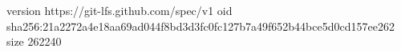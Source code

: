 version https://git-lfs.github.com/spec/v1
oid sha256:21a2272a4e18aa69ad044f8bd3d3fc0fc127b7a49f652b44bce5d0cd157ee262
size 262240

